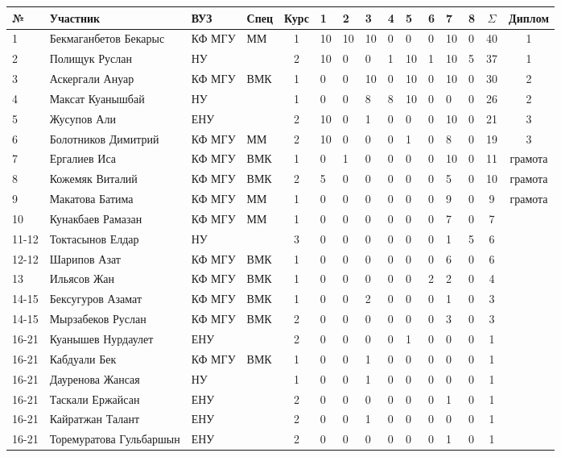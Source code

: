 \begin{tabular}{|l|p{3.3cm}|l|l|c|*{8}{p{0.3cm}|}c|c|}
\hline
№ & Участник & ВУЗ & Спец & Курс & 1 & 2 & 3 & 4 & 5 & 6 & 7 & 8 & $\Sigma$ & Диплом\\
\hline
1 & Бекмаганбетов  Бекарыс & КФ МГУ & ММ & 1 & 10 & 10 & 10 & 0 & 0 & 0 & 10 & 0 & 40 & 1\\
\hline
2 & Полищук Руслан & НУ &  & 2 & 10 & 0 & 0 & 1 & 10 & 1 & 10 & 5 & 37 & 1\\
\hline
3 & Аскергали Ануар & КФ МГУ & ВМК & 1 & 0 & 0 & 10 & 0 & 10 & 0 & 10 & 0 & 30 & 2\\
\hline
4 & Максат Куанышбай & НУ &  & 1 & 0 & 0 & 8 & 8 & 10 & 0 & 0 & 0 & 26 & 2\\
\hline
5 & Жусупов Али & ЕНУ &  & 2 & 10 & 0 & 1 & 0 & 0 & 0 & 10 & 0 & 21 & 3\\
\hline
6 & Болотников  Димитрий & КФ МГУ & ММ & 2 & 10 & 0 & 0 & 0 & 1 & 0 & 8 & 0 & 19 & 3\\
\hline
7 & Ергалиев Иса & КФ МГУ & ВМК & 1 & 0 & 1 & 0 & 0 & 0 & 0 & 10 & 0 & 11 & грамота\\
\hline
8 & Кожемяк Виталий & КФ МГУ & ВМК & 2 & 5 & 0 & 0 & 0 & 0 & 0 & 5 & 0 & 10 & грамота\\
\hline
9 & Макатова Батима & КФ МГУ & ММ & 1 & 0 & 0 & 0 & 0 & 0 & 0 & 9 & 0 & 9 & грамота\\
\hline
10 & Кунакбаев Рамазан & КФ МГУ & ММ & 1 & 0 & 0 & 0 & 0 & 0 & 0 & 7 & 0 & 7 & \\
\hline
11-12 & Токтасынов Елдар & НУ &  & 3 & 0 & 0 & 0 & 0 & 0 & 0 & 1 & 5 & 6 & \\
\hline
12-12 & Шарипов Азат & КФ МГУ & ВМК & 1 & 0 & 0 & 0 & 0 & 0 & 0 & 6 & 0 & 6 & \\
\hline
13 & Ильясов Жан & КФ МГУ & ВМК & 1 & 0 & 0 & 0 & 0 & 0 & 2 & 2 & 0 & 4 & \\
\hline
14-15 & Бексугуров Азамат & КФ МГУ & ВМК & 1 & 0 & 0 & 2 & 0 & 0 & 0 & 1 & 0 & 3 & \\
\hline
14-15 & Мырзабеков Руслан & КФ МГУ & ВМК & 2 & 0 & 0 & 0 & 0 & 0 & 0 & 3 & 0 & 3 & \\
\hline
16-21 & Куанышев Нурдаулет & ЕНУ &  & 2 & 0 & 0 & 0 & 0 & 1 & 0 & 0 & 0 & 1 & \\
\hline
16-21 & Кабдуали Бек & КФ МГУ & ВМК & 1 & 0 & 0 & 1 & 0 & 0 & 0 & 0 & 0 & 1 & \\
\hline
16-21 & Дауренова Жансая & НУ &  & 1 & 0 & 0 & 1 & 0 & 0 & 0 & 0 & 0 & 1 & \\
\hline
16-21 & Таскали Ержайсан & ЕНУ &  & 2 & 0 & 0 & 0 & 0 & 0 & 0 & 1 & 0 & 1 & \\
\hline
16-21 & Кайратжан Талант & ЕНУ &  & 2 & 0 & 0 & 1 & 0 & 0 & 0 & 0 & 0 & 1 & \\
\hline
16-21 & Торемуратова  Гульбаршын & ЕНУ &  & 2 & 0 & 0 & 0 & 0 & 0 & 0 & 1 & 0 & 1 & \\
\hline
\end{tabular}